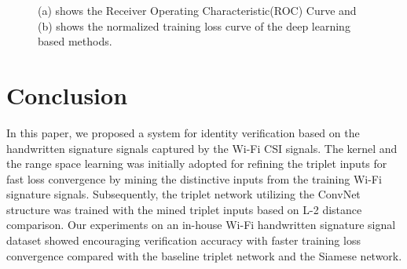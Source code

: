 \documentclass[runningheads]{llncs}
\begin{document}
\begin{figure}[!ht]
    \begin{center}
    \caption{(a) shows the Receiver Operating Characteristic(ROC) Curve and 
    (b) shows the normalized training loss curve of the deep learning based methods. }
    \label{fig2}
    \end{center}
 \end{figure}

\section{Conclusion}
In this paper, we proposed a system for identity verification based on the handwritten signature signals captured by the Wi-Fi CSI signals. 
The kernel and the range space learning was initially adopted for refining the triplet inputs for fast loss convergence by mining the distinctive inputs from the training Wi-Fi signature signals. 
Subsequently, the triplet network utilizing the ConvNet structure was trained with the mined triplet inputs based on L-2 distance comparison. 
Our experiments on an in-house Wi-Fi handwritten signature signal dataset showed encouraging verification accuracy with faster training loss convergence compared with the baseline triplet network and the Siamese network.
%
%
%
%
%
%


\clearpage



\end{document}
